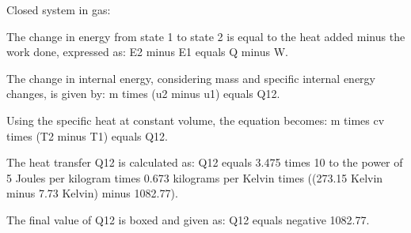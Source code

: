 Closed system in gas:

The change in energy from state 1 to state 2 is equal to the heat added minus the work done, expressed as:
E2 minus E1 equals Q minus W.

The change in internal energy, considering mass and specific internal energy changes, is given by:
m times (u2 minus u1) equals Q12.

Using the specific heat at constant volume, the equation becomes:
m times cv times (T2 minus T1) equals Q12.

The heat transfer Q12 is calculated as:
Q12 equals 3.475 times 10 to the power of 5 Joules per kilogram times 0.673 kilograms per Kelvin times ((273.15 Kelvin minus 7.73 Kelvin) minus 1082.77).

The final value of Q12 is boxed and given as:
Q12 equals negative 1082.77.